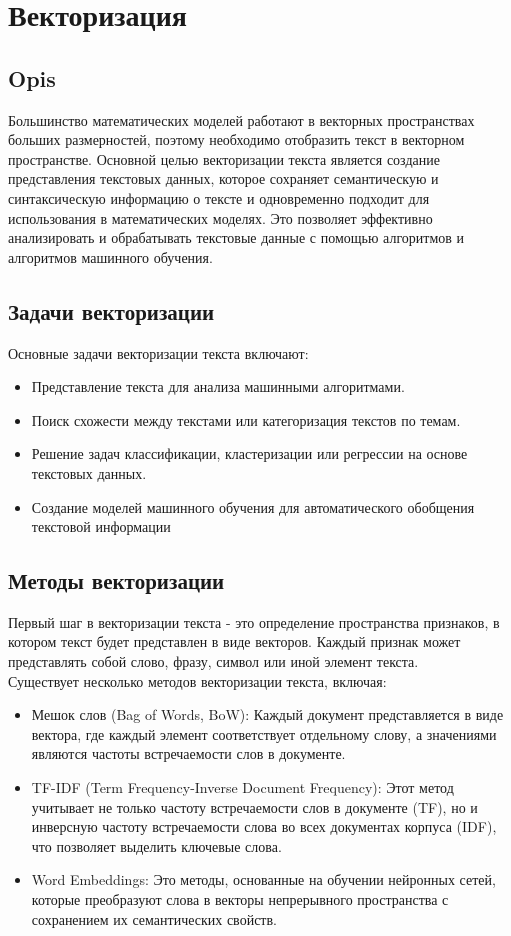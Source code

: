 \section{Векторизация}

	\subsection{Opis}
		Большинство математических моделей работают в векторных пространствах больших размерностей, поэтому необходимо отобразить текст в векторном пространстве. Основной целью векторизации текста является создание представления текстовых данных, которое сохраняет семантическую и синтаксическую информацию о тексте и одновременно подходит для использования в математических моделях. Это позволяет эффективно анализировать и обрабатывать текстовые данные с помощью алгоритмов и алгоритмов машинного обучения.

	\subsection{Задачи векторизации}
		Основные задачи векторизации текста включают:
		\begin{itemize}
			\item Представление текста для анализа машинными алгоритмами.
			\item Поиск схожести между текстами или категоризация текстов по темам.
			\item Решение задач классификации, кластеризации или регрессии на основе текстовых данных.
			\item Создание моделей машинного обучения для автоматического обобщения текстовой информации
		\end{itemize}

	\subsection{Методы векторизации}
		Первый шаг в векторизации текста - это определение пространства признаков, в котором текст будет представлен в виде векторов. Каждый признак может представлять собой слово, фразу, символ или иной элемент текста.\\
		Существует несколько методов векторизации текста, включая:
		\begin{itemize}
			\item Мешок слов (Bag of Words, BoW): Каждый документ представляется в виде вектора, где каждый элемент соответствует отдельному слову, а значениями являются частоты встречаемости слов в документе.
			\item TF-IDF (Term Frequency-Inverse Document Frequency): Этот метод учитывает не только частоту встречаемости слов в документе (TF), но и инверсную частоту встречаемости слова во всех документах корпуса (IDF), что позволяет выделить ключевые слова.
			\item Word Embeddings: Это методы, основанные на обучении нейронных сетей, которые преобразуют слова в векторы непрерывного пространства с сохранением их семантических свойств.\\
		\end{itemize}

